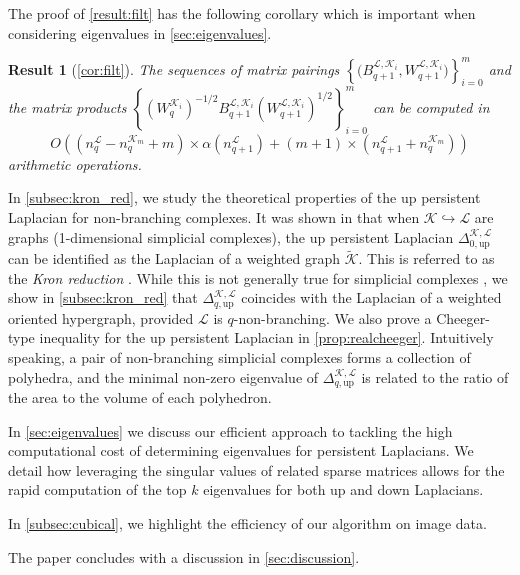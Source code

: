 \documentclass{article}
\newtheorem{resultx}{Result}
\theoremstyle{definition}
\newcommand{\KK}{\mathcal{K}}
\newcommand{\LL}{\mathcal{L}}
\begin{document}
The proof of \cref{result:filt} has the following corollary which is important when considering eigenvalues in \cref{sec:eigenvalues}.
\begin{resultx}[\cref{cor:filt}]
    The sequences of matrix pairings $\left\{\big(B_{q+1}^{\LL, \KK_i}, W_{q+1}^{\LL, \KK_i}\big)\right\}_{i=0}^m$ and the matrix products 
$\left\{(W_q^{\KK_i})^{-1/2}B_{q+1}^{\LL, \KK_i} (W_{q+1}^{\LL, \KK_i})^{1/2}\right\}_{i=0}^m$ can be computed in 
\[
O\left((n_q^\LL-n_q^{\KK_m}+m)\times \alpha(n_{q+1}^\LL) + (m+1)\times (n_{q+1}^\LL + n_q^{\KK_m})\right)
\]
arithmetic operations.
\end{resultx}

\setcounter{theorem}{0}

In \cref{subsec:kron_red}, we study the theoretical properties of the up persistent Laplacian for non-branching complexes. It was shown in \cite[Section 4.3]{pers_lap} that when $\KK \hookrightarrow \LL$ are graphs (1-dimensional simplicial complexes), the up persistent Laplacian $\Delta_{0, \mathrm{up}}^{\KK, \LL}$ can be identified as the Laplacian of a weighted graph $\widetilde{\KK}$. This is referred to as the \emph{Kron reduction} \cite{MR3017573}. While this is not generally true for simplicial complexes \cite[Remark 4.12]{pers_lap}, we show in \cref{subsec:kron_red} that $\Delta_{q, \mathrm{up}}^{\KK, \LL}$ coincides with the Laplacian of a weighted oriented hypergraph, provided $\LL$ is $q$-non-branching. We also prove a Cheeger-type inequality for the up persistent Laplacian in \cref{prop:realcheeger}. Intuitively speaking, a pair of non-branching simplicial complexes forms a collection of polyhedra, and the minimal non-zero eigenvalue of $\Delta_{q, \mathrm{up}}^{\KK, \LL}$ is related to the ratio of the area to the volume of each polyhedron.

In \cref{sec:eigenvalues} we discuss our efficient approach to tackling the high computational cost of determining eigenvalues for persistent Laplacians. We detail how leveraging the singular values of related sparse matrices allows for the rapid computation of the top $k$ eigenvalues for both up and down Laplacians.

In \cref{subsec:cubical}, we highlight the efficiency of our algorithm on image data.

The paper concludes with a discussion in \cref{sec:discussion}.
\end{document}
